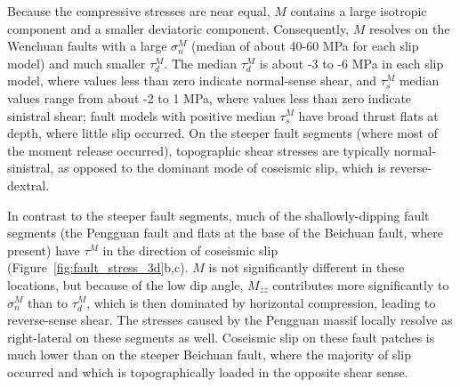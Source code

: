 \documentclass[draft,jgrga]{AGUTeX}
\begin{document}
\begin{article}

Because the compressive stresses are near equal, $M$ contains a large
isotropic component and a smaller deviatoric component. Consequently, $M$
resolves on the Wenchuan faults with a large $\sigma^M_n$ (median of
about 40-60 MPa for each slip model) and much smaller $\tau^M_d$. The
median $\tau^M_d$ is about -3 to -6 MPa in each slip model, where values
less than zero indicate normal-sense shear, and $\tau^M_s$ median values
range from about -2 to 1 MPa, where values less than zero indicate
sinistral shear; fault models with positive median $\tau^M_s$ have broad
thrust flats at depth, where little slip occurred. On the steeper fault
segments (where most of the moment release occurred), topographic shear
stresses are typically normal-sinistral, as opposed to the dominant mode
of coseismic slip, which is reverse-dextral.


In contrast to the steeper fault segments, much of the shallowly-dipping
fault segments (the Pengguan fault and flats at the base of the Beichuan
fault, where present) have $\tau^M$ in the direction of coseismic slip
(Figure~\ref{fig:fault_stress_3d}b,c).
$M$ is not significantly different in these
locations, but because of the low dip angle, $M_{zz}$ contributes more
significantly to $\sigma^M_n$ than to $\tau^M_d$, which is then
dominated by horizontal compression, leading to reverse-sense shear.
The stresses caused by the Pengguan massif locally resolve
as right-lateral on these segments as well. Coseismic slip on these
fault patches is much lower than on the steeper Beichuan fault, where
the majority of slip occurred and which is topographically loaded in the
opposite shear sense.


\end{article}
\end{document}
